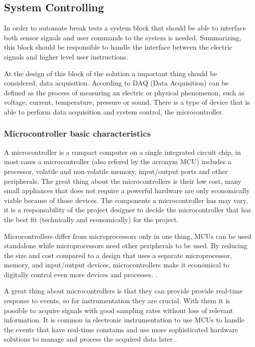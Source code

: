 \subsection{System Controlling}\label{ssec:mcu-review}
	In order to automate break tests a system block that should be able to interface both sensor signals and user commands to the system is needed. Summarizing, this block should be responsible to handle the interface between the electric signals and higher level user instructions.
	\par
	At the design of this block of the solution a important thing should be considered, data acquisition. According to \cite{ni-daq} DAQ (Data Acquisition) can be defined as the process of measuring an electric or physical phenomenon, such as voltage, current, temperature, pressure or sound. There is a type of device that is able to perform data acquisition and system control, the microcontroller.

	\subsubsection{Microcontroller basic characteristics}\label{sssec:microcontroller-basic-characteristics}

		A microcontroller is a compact computer on a single integrated circuit chip, in most cases a microcontroller (also refered by the acronym MCU) includes a processor, volatile and non-volatile memory, input/output ports and other peripherals. The great thing about the microcontrollers is their low cost, many small appliances that does not require a powerful hardware are only economically viable because of those devices. The components a microcontroller has may vary, it is a responsability of the project designer to decide the microcontroller that has the best fit (technically and economically) for the project.
		\par
		Microcontrollers differ from microprocessors only in one thing, MCUs can be used standalone while microprocessors need other peripherals to be used. By reducing the size and cost compared to a design that uses a separate microprocessor, memory, and input/output devices, microcontrollers make it economical to digitally control even more devices and processes. \cite{mcuDef}.
		\par
		A great thing about microcontrollers is that they can provide provide real-time response to events, so for instrumentation they are crucial. With them it is possible to acquire signals with good sampling rates without loss of relevant information. It is common in electronic instrumentation to use MCUs to handle the events that have real-time constains and use more sophisticated hardware solutions to manage and process the acquired data later \cite{bartz2004data}.

